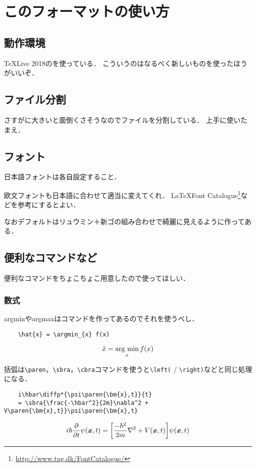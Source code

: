 \section{このフォーマットの使い方}

\subsection{動作環境}

\TeX{}Live 2018の\upLaTeX{}を使っている．
こういうのはなるべく新しいものを使ったほうがいいぞ．

\subsection{ファイル分割}

さすがに大きいと面倒くさそうなのでファイルを分割している．
上手に使いたまえ．

\subsection{フォント}

日本語フォントは各自設定すること．

欧文フォントも日本語に合わせて適当に変えてくれ．
\LaTeX Font Catalogue\footnote{\url{http://www.tug.dk/FontCatalogue/}}などを参考にするとよい．

なおデフォルトはリュウミン＋新ゴの組み合わせで綺麗に見えるように作ってある．

\subsection{便利なコマンドなど}

便利なコマンドをちょこちょこ用意したので使ってほしい．

\subsubsection{数式}

argminやargmaxはコマンドを作ってあるのでそれを使うべし．
\begin{verbatim}
    \hat{x} = \argmin_{x} f(x)
\end{verbatim}
\begin{equation}
    \hat{x} = \operatorname*{arg~min}_{x} f(x)
\end{equation}

括弧は\verb|\paren|，\verb|\sbra|，\verb|\cbra|コマンドを使うと\verb|\left(| / \verb|\right)|などと同じ処理になる．
\begin{verbatim}
    i\hbar\diffp*{\psi\paren{\bm{x},t}}{t}
    = \sbra{\frac{-\hbar^2}{2m}\nabla^2 + V\paren{\bm{x},t}}\psi\paren{\bm{x},t}
\end{verbatim}
\begin{equation}
    i\hbar\diffp*{\psi\paren{\bm{x},t}}{t} = \sbra{\frac{-\hbar^2}{2m}\nabla^2 + V\paren{\bm{x},t}}\psi\paren{\bm{x},t}
\end{equation}

